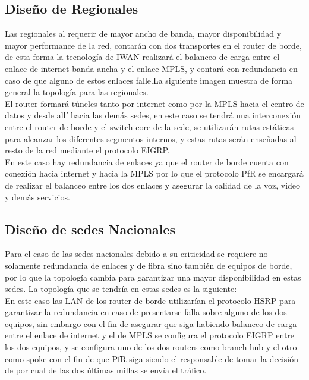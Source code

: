 \subsection{Diseño de Regionales}
\label{sec:Diseño de Regionales}

Las regionales al requerir de mayor ancho de banda, mayor disponibilidad y mayor performance de la red, contarán con dos transportes en el router de borde, de esta forma la tecnología de IWAN realizará el balanceo de carga entre el enlace de internet banda ancha y el enlace MPLS, y contará con redundancia en caso de que alguno de estos enlaces falle.La siguiente imagen muestra de forma general la topología para las regionales.
\\
El router formará túneles tanto por internet como por la MPLS hacia el centro de datos y desde allí hacia las demás sedes, en este caso se tendrá una interconexión entre el router de borde y el switch core de la sede, se utilizarán rutas estáticas para alcanzar los diferentes segmentos internos, y estas rutas serán enseñadas al resto de la red mediante el protocolo EIGRP.\\
En este caso hay redundancia de enlaces ya que el router de borde cuenta con conexión hacia internet y hacia la MPLS por lo que el protocolo PfR se encargará de realizar el balanceo entre los dos enlaces y asegurar la calidad de la voz, video y demás servicios.

\subsection{Diseño de sedes Nacionales}
\label{sec:Diseño de sedes Nacionales}

Para el caso de las sedes nacionales debido a su criticidad se requiere no solamente redundancia de enlaces y de fibra sino también de equipos de borde, por lo que la topología cambia para garantizar una mayor disponibilidad en estas sedes. La topología que se tendría en estas sedes es la siguiente:
\\
En este caso las LAN de los router de borde utilizarían el protocolo HSRP para garantizar la redundancia en caso de presentarse falla sobre alguno de los dos equipos, sin embargo con el fin de asegurar que siga habiendo balanceo de carga entre el enlace de internet y el de MPLS se configura el protocolo EIGRP entre los dos equipos, y se configura uno de los dos routers como branch hub y el otro como spoke con el fin de que PfR siga siendo el responsable de tomar la decisión de por cual de las dos últimas millas se envía el tráfico.
\\
